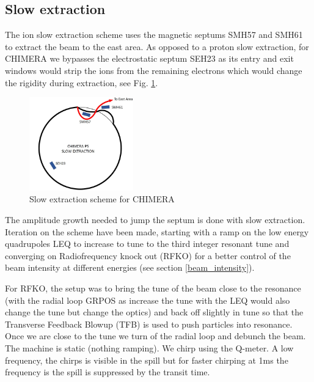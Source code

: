 \subsection{Slow extraction}

The ion slow extraction scheme uses the magnetic septums SMH57 and SMH61 to extract the beam to the east area. As opposed to a proton slow extraction, for CHIMERA we bypasses the electrostatic septum SEH23 as its entry and exit windows would strip the ions from the remaining electrons which would change the rigidity during extraction, see Fig. \ref{fig:sx}.

\begin{figure}[!htb]
\centering
\includegraphics[width=0.4\textwidth]{images/SX_CHIMERA.jpg}
\caption{Slow extraction scheme for CHIMERA}
\label{fig:sx}
\end{figure}

The amplitude growth needed to jump the septum is done with slow extraction. Iteration on the scheme have been made, starting with a ramp on the low energy quadrupoles LEQ to increase to tune to the third integer resonant tune and converging on Radiofrequency knock out (RFKO) for a better control of the beam intensity at different energies (see section \ref{beam_intensity}).

For RFKO, the setup was to bring the tune of the beam close to the resonance (with the radial loop GRPOS as increase the tune with the LEQ would also change the tune but change the optics) and back off slightly in tune so that the Transverse Feedback Blowup (TFB) is used to push particles into resonance. Once we are close to the tune we turn of the radial loop and debunch the beam. The machine is static (nothing ramping). We chirp using the Q-meter. A low frequency, the chirps is visible in the spill but for faster chirping at 1ms the frequency is the spill is suppressed by the transit time.